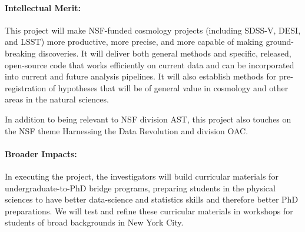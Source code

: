 \documentclass[12pt, fullpage, letterpaper]{article}
\begin{document}
\paragraph{Intellectual Merit:}
This project will make NSF-funded cosmology projects (including
SDSS-V, DESI, and LSST) more productive, more precise, and more
capable of making ground-breaking discoveries.
It will deliver both general methods and specific, released,
open-source code that works efficiently on current data and can be
incorporated into current and future analysis pipelines.
It will also establish methods for pre-registration of hypotheses that
will be of general value in cosmology and other areas in the natural
sciences.

In addition to being relevant to NSF division AST, this project also
touches on the NSF theme Harnessing the Data Revolution and division
OAC.

\paragraph{Broader Impacts:}
In executing the project, the investigators will build curricular
materials for undergraduate-to-PhD bridge programs, preparing students
in the physical sciences to have better data-science and statistics
skills and therefore better PhD preparations.
We will test and refine these curricular materials in workshops for
students of broad backgrounds in New York City.
\end{document}
